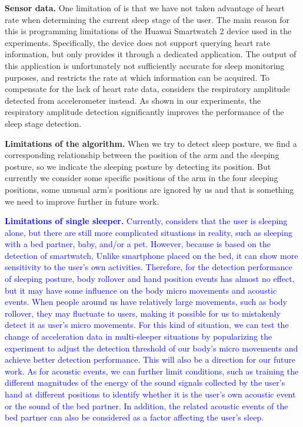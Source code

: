 \begin{itemize}
  \item \textbf{Sensor data.}
  One limitation of {\systemname} is that we have not taken advantage of heart rate when determining the current sleep stage of the user. The main reason for this is programming limitations of the Huawai Smartwatch 2 device used in the experiments. Specifically, the device does not support querying heart rate information, but only provides it through a dedicated application. The output of this application is unfortunately not sufficiently accurate for sleep monitoring purposes, and restricts the rate at which information can be acquired. To compensate for the lack of heart rate data, \systemname considers the respiratory amplitude detected from accelerometer instead. As shown in our experiments, the respiratory amplitude detection significantly improves the performance of the sleep stage detection. %
  \item \textbf{Limitations of the algorithm.}
  When we try to detect sleep posture, we find a corresponding relationship between the position of the arm and the sleeping posture, so we indicate the sleeping posture by detecting its position. But currently we consider some specific positions of the arm in the four sleeping positions, some unusual arm's positions are ignored by us and that is something we need to improve further in future work.
  
  \textcolor{blue}{\item \textbf{Limitations of single sleeper.}
  Currently, {\systemname} considers that the user is sleeping alone, but there are still more complicated situations in reality, such as sleeping with a bed partner, baby, and/or a pet. However, because {\systemname} is based on the detection of smartwatch, Unlike smartphone placed on the bed, it can show more sensitivity to the user's own activities. Therefore, for the detection performance of sleeping posture, body rollover and hand position events has almost no effect, but it may have some influence on the body micro movements and acoustic events. When people around us have relatively large movements, such as body rollover, they may fluctuate to users, making it possible for us to mistakenly detect it as user's micro movements. For this kind of situation, we can test the change of acceleration data in multi-sleeper situations by popularizing the experiment to adjust the detection threshold of our body's micro movements and achieve better detection performance. This will also be a direction for our future work. As for acoustic events, we can further limit conditions, such as training the different magnitudes of the energy of the sound signals collected by the user's hand at different positions to identify whether it is the user's own acoustic event or the sound of the bed partner. In addition, the related acoustic events of the bed partner can also be considered as a factor affecting the user's sleep.}
  

\end{itemize}
